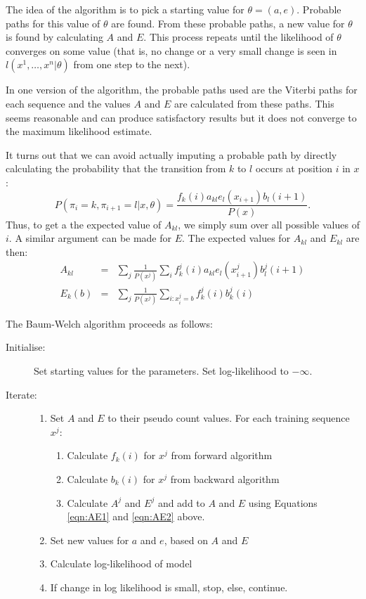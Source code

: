 \documentclass[11pt]{article}
\begin{document}
The idea of the algorithm is to pick a starting value for $\theta = (a,e)$.  Probable paths for this value of $\theta$ are found.  From these probable paths, a new value for $\theta$ is found by calculating $A$ and $E$. This process repeats until the likelihood of $\theta$ converges on some value (that is, no change or a very small change is seen in $l(x^1,\ldots,x^n| \theta)$ from one step to the next).  
 
In one version of the  algorithm, the probable paths used are the Viterbi paths for each sequence and the values $A$ and $E$ are calculated from these paths. This seems reasonable and can produce satisfactory results but it does not converge to the maximum likelihood estimate.

It turns out that we can avoid actually imputing a probable path by directly calculating the probability that the transition from $k$ to $l$ occurs at position $i$ in $x$: 
\[P(\pi_i = k,\pi_{i+1} = l | x,\theta) = \frac{f_k(i)a_{kl}e_l(x_{i+1})b_l(i+1)}{P(x)}. \]
Thus, to get a the expected value of $A_{kl}$, we simply sum over all possible values of $i$.  A similar argument can be made for $E$.  The expected values for  $A_{kl}$ and $E_{kl}$ are then:
\begin{eqnarray}\label{eqn:AE1}
A_{kl} & = & \sum_j \frac{1}{P(x^j)} \sum_i f_k^j(i) a_{kl} e_l (x_{i+1}^j)b_l^j(i+1) \\
\label{eqn:AE2}
E_k(b) & = & \sum_j \frac{1}{P(x^j)} \sum_{i:x_i^j = b} f_k^j(i)b_k^j(i)
\end{eqnarray}

The Baum-Welch algorithm proceeds as follows:

\begin{description}
\item[Initialise:] Set starting values for the parameters.  Set log-likelihood to $-\infty$.
\item[Iterate:] 
\begin{enumerate}
\item Set $A$ and $E$ to their pseudo count values.  For each training sequence $x^j$:
\begin{enumerate}
\item Calculate $f_k(i)$ for $x^j$ from forward algorithm
\item Calculate $b_k(i)$ for  $x^j$ from backward algorithm
\item Calculate $A^j$ and $E^j$ and add to $A$ and $E$ using Equations \ref{eqn:AE1} and \ref{eqn:AE2} above.
\end{enumerate}
\item Set new values for $a$ and $e$, based on $A$ and $E$
\item Calculate log-likelihood of model
\item If change in log likelihood is small, stop, else, continue.
\end{enumerate}
\end{description}
\end{document}
